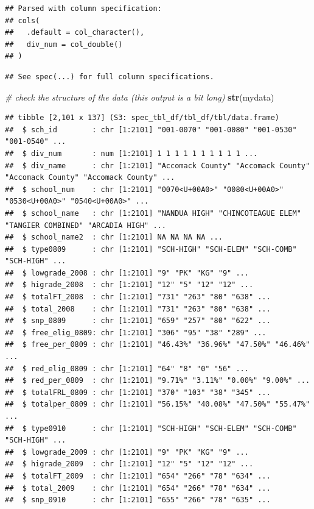 \documentclass[
]{book}
\newenvironment{Shaded}{\begin{snugshade}}{\end{snugshade}}
\newcommand{\CommentTok}[1]{\textcolor[rgb]{0.56,0.35,0.01}{\textit{#1}}}
\newcommand{\KeywordTok}[1]{\textcolor[rgb]{0.13,0.29,0.53}{\textbf{#1}}}
\newcommand{\NormalTok}[1]{#1}
\begin{document}
\begin{verbatim}
## Parsed with column specification:
## cols(
##   .default = col_character(),
##   div_num = col_double()
## )
\end{verbatim}

\begin{verbatim}
## See spec(...) for full column specifications.
\end{verbatim}

\begin{Shaded}
\begin{Highlighting}[]
\CommentTok{\# check the structure of the data (this output is a bit long)}
\KeywordTok{str}\NormalTok{(mydata)}
\end{Highlighting}
\end{Shaded}

\begin{verbatim}
## tibble [2,101 x 137] (S3: spec_tbl_df/tbl_df/tbl/data.frame)
##  $ sch_id        : chr [1:2101] "001-0070" "001-0080" "001-0530" "001-0540" ...
##  $ div_num       : num [1:2101] 1 1 1 1 1 1 1 1 1 1 ...
##  $ div_name      : chr [1:2101] "Accomack County" "Accomack County" "Accomack County" "Accomack County" ...
##  $ school_num    : chr [1:2101] "0070<U+00A0>" "0080<U+00A0>" "0530<U+00A0>" "0540<U+00A0>" ...
##  $ school_name   : chr [1:2101] "NANDUA HIGH" "CHINCOTEAGUE ELEM" "TANGIER COMBINED" "ARCADIA HIGH" ...
##  $ school_name2  : chr [1:2101] NA NA NA NA ...
##  $ type0809      : chr [1:2101] "SCH-HIGH" "SCH-ELEM" "SCH-COMB" "SCH-HIGH" ...
##  $ lowgrade_2008 : chr [1:2101] "9" "PK" "KG" "9" ...
##  $ higrade_2008  : chr [1:2101] "12" "5" "12" "12" ...
##  $ totalFT_2008  : chr [1:2101] "731" "263" "80" "638" ...
##  $ total_2008    : chr [1:2101] "731" "263" "80" "638" ...
##  $ snp_0809      : chr [1:2101] "659" "257" "80" "622" ...
##  $ free_elig_0809: chr [1:2101] "306" "95" "38" "289" ...
##  $ free_per_0809 : chr [1:2101] "46.43%" "36.96%" "47.50%" "46.46%" ...
##  $ red_elig_0809 : chr [1:2101] "64" "8" "0" "56" ...
##  $ red_per_0809  : chr [1:2101] "9.71%" "3.11%" "0.00%" "9.00%" ...
##  $ totalFRL_0809 : chr [1:2101] "370" "103" "38" "345" ...
##  $ totalper_0809 : chr [1:2101] "56.15%" "40.08%" "47.50%" "55.47%" ...
##  $ type0910      : chr [1:2101] "SCH-HIGH" "SCH-ELEM" "SCH-COMB" "SCH-HIGH" ...
##  $ lowgrade_2009 : chr [1:2101] "9" "PK" "KG" "9" ...
##  $ higrade_2009  : chr [1:2101] "12" "5" "12" "12" ...
##  $ totalFT_2009  : chr [1:2101] "654" "266" "78" "634" ...
##  $ total_2009    : chr [1:2101] "654" "266" "78" "634" ...
##  $ snp_0910      : chr [1:2101] "655" "266" "78" "635" ...

\end{verbatim}
\end{document}
